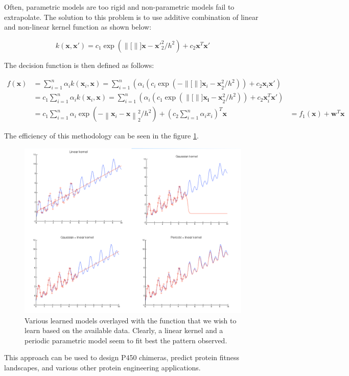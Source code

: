 \documentclass[a4paper,10pt,twoside]{article}
\newcommand\norm[1]{\left\lVert#1\right\rVert}
\begin{document}
Often, parametric models are too rigid and non-parametric models fail to extrapolate. The solution to this problem is to use additive combination of linear and non-linear kernel function as shown below:

\begin{equation*}
    k(\mathbf{x}, \mathbf{x}') = c_1\exp\left(\norm[]{\mathbf{x} - \mathbf{x}'}_2^2/h^2\right) + c_2\mathbf{x}^T\mathbf{x}'
\end{equation*}

The decision function is then defined as follows:

\begin{align*}
    f(\mathbf{x}) &= \sum_{i=1}^{n}\alpha_i k(\mathbf{x}_i, \mathbf{x})=\sum_{i=1}^{n}\left(\alpha_i(c_i \exp(-\norm[]{\mathbf{x}_i-\mathbf{x}}_2^2/h^2))+c_2\mathbf{x}_i\mathbf{x}'\right)\\
    &= c_1 \sum_{i=1}^{n}\alpha_i k(\mathbf{x}_i,\mathbf{x}) = \sum_{i=1}^{n}\left(\alpha_i(c_1\exp\left(\norm[]{\mathbf{x_i-\mathbf{x}}_2^2/h^2}\right))+c_2\mathbf{x}_i^T\mathbf{x}'\right)\\
    &= c_1\sum_{i=1}^{n}\alpha_i\exp\left(-\norm{\mathbf{x}_i-\mathbf{x}}_2^2/h^2\right) + \left(c_2\sum_{i=1}^{n}\alpha_ix_i\right)^T\mathbf{x}
    &= f_1(\mathbf{x})+\mathbf{w}^T\mathbf{x}
\end{align*}

The efficiency of this methodology can be seen in the figure \ref{semiparametricregression}.

\begin{figure}[htbp]
    \centering
    \includegraphics[width=.5\textwidth]{figures/semi-parametric-regression.png}
    \caption{Various learned models overlayed with the function that we wish to learn based on the available data. Clearly, a linear kernel and a periodic parametric model seem to fit best the pattern observed.}
    \label{semiparametricregression}
\end{figure}

This approach can be used to design P450 chimeras, predict protein fitness landscapes, and various other protein engineering applications.
\end{document}
